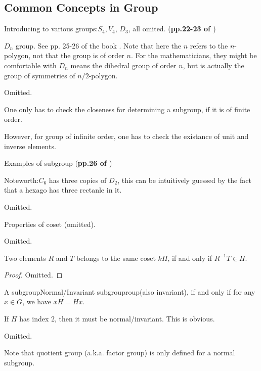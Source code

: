 
\subsection{Common Concepts in Group}
\label{sec:Common-Concepts-in-Group}

Introducing to various groups:$S_4, V_4$, $D_3$, all omited.
(\textbf{pp.22-23 of \cite{book}})

$D_n$ group. See pp. 25-26 of the book \cite{book}.
Note that here the $n$ refers to the $n$-polygon, not that the group is
of order $n$. For the mathematicians, they might be comfortable with
$D_n$ means the dihedral group of order $n$, but is actually the group of
symmetries of $n/2$-polygon.

\begin{defi}[Subgroup]
    Omitted.
\end{defi}
\begin{fact}
    One only has to check the closeness for determining a subgroup, if it
    is of finite order.

    However, for group of infinite order, one has to check the existance
    of unit and inverse elements.
\end{fact}
Examples of subgroup (\textbf{pp.26 of \cite{book}})

Noteworth:$C_6$ has three copies of $D_2$, this can be intuitively 
guessed by the fact that a hexago has three rectanle in it.

\begin{defi}[Coset]
    Omitted.
\end{defi}
Properties of coset (omitted).

\begin{defi}
    Omitted.
\end{defi}

\begin{prop}
    Two elements $R$ and $T$ belongs to the same coset $kH$, if and only
    if $R^{-1}T\in H$.
\end{prop}
\begin{proof}
    Omitted.
\end{proof}
\begin{defi}
    A subgroupNormal/Invariant subgrouproup(also invariant), if and only
    if for any $x\in G$, we have $xH = Hx$.
\end{defi}
\begin{fact}
    If $H$ has index 2, then it must be normal/invariant. This is
    obvious.
\end{fact}
\begin{defi}[Quotient]
    Omitted.
\end{defi}
Note that quotient group (a.k.a. factor group) is only defined for a normal subgroup.

